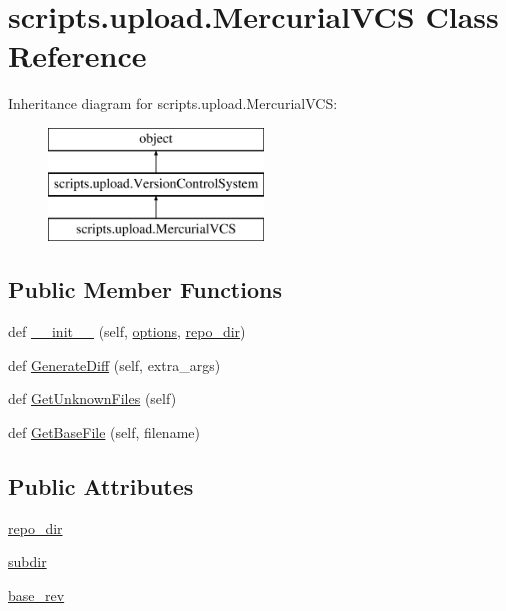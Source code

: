 \hypertarget{classscripts_1_1upload_1_1_mercurial_v_c_s}{}\section{scripts.\+upload.\+Mercurial\+V\+CS Class Reference}
\label{classscripts_1_1upload_1_1_mercurial_v_c_s}
Inheritance diagram for scripts.\+upload.\+Mercurial\+V\+CS\+:\begin{figure}[H]
\begin{center}
\leavevmode
\includegraphics[height=3.000000cm]{d7/dcf/classscripts_1_1upload_1_1_mercurial_v_c_s}
\end{center}
\end{figure}
\subsection*{Public Member Functions}
\begin{DoxyCompactItemize}
\item 
def \mbox{\hyperlink{classscripts_1_1upload_1_1_mercurial_v_c_s_aee48a25ac8946b03569f178bfb9223ad}{\+\_\+\+\_\+init\+\_\+\+\_\+}} (self, \mbox{\hyperlink{classscripts_1_1upload_1_1_version_control_system_a090853e1034cd5dfe4fd0118201e5af1}{options}}, \mbox{\hyperlink{classscripts_1_1upload_1_1_mercurial_v_c_s_a39626d66e75c5e010e7d3add346896e0}{repo\+\_\+dir}})
\item 
def \mbox{\hyperlink{classscripts_1_1upload_1_1_mercurial_v_c_s_a3daf7aa68fe23bc4d062553d8e46b5e3}{Generate\+Diff}} (self, extra\+\_\+args)
\item 
def \mbox{\hyperlink{classscripts_1_1upload_1_1_mercurial_v_c_s_ac8cd9647f5029dc05a0584cfb9933a6a}{Get\+Unknown\+Files}} (self)
\item 
def \mbox{\hyperlink{classscripts_1_1upload_1_1_mercurial_v_c_s_ac266a482242d3bf373da45602793f326}{Get\+Base\+File}} (self, filename)
\end{DoxyCompactItemize}
\subsection*{Public Attributes}
\begin{DoxyCompactItemize}
\item 
\mbox{\hyperlink{classscripts_1_1upload_1_1_mercurial_v_c_s_a39626d66e75c5e010e7d3add346896e0}{repo\+\_\+dir}}
\item 
\mbox{\hyperlink{classscripts_1_1upload_1_1_mercurial_v_c_s_ad6247a65a744bb8538975a94005039d8}{subdir}}
\item 
\mbox{\hyperlink{classscripts_1_1upload_1_1_mercurial_v_c_s_a7dcbcd0b325eb905734bcff1865237d5}{base\+\_\+rev}}
\end{DoxyCompactItemize}
